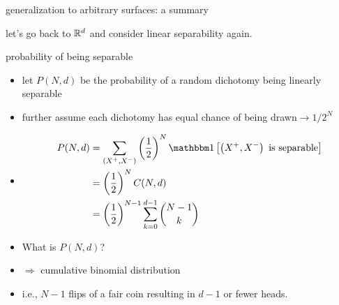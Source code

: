 \documentclass[aspectratio=169, 11pt, handout]{beamer}
\begin{document}
\begin{frame}{generalization to arbitrary surfaces: a summary}
\end{frame}


\begin{frame}{}
  \centering
  {\large let's go back to $\mathbb{R}^d$ and consider linear separability again.}
\end{frame}
  
\begin{frame}{probability of being separable}
  \begin{itemize}
  \item let $P(N, d)$ be the probability of a random dichotomy being linearly separable\pause
  \item further assume each dichotomy has equal chance of being drawn\pause $\rightarrow 1/2^N$\pause
  \item[] {
      \begin{align*}
        P(N, d) &= \sum_{\bipart} \pr{\frac{1}{2}}^N \indicator{\bipart \text{ is separable}} \\
                &=\pr{\frac{1}{2}}^N C(N, d) \\
                &= \pr{\frac{1}{2}}^{N-1} \sum\limits_{k=0}^{d-1} {N-1 \choose k}
      \end{align*}\pause
    }
  \item What is $P(N, d)$?\pause
  \item $\Rightarrow$ cumulative binomial distribution
  \item[] i.e., $N-1$ flips of a fair coin resulting in $d-1$ or fewer heads.
  \end{itemize}
\end{frame}
\end{document}
